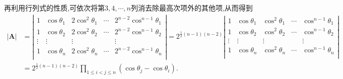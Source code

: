 \documentclass[../../main.tex]{subfiles}
\begin{document}
\begin{solution}
再利用行列式的性质,可依次将第\(3,4,\cdots,n\)列消去除最高次项外的其他项,从而得到
\begin{align*}
|\boldsymbol{A}|&=\left| \begin{matrix}
1&		\cos \theta _1&		2\cos ^2\theta _1&		\cdots&		2^{n-2}\cos ^{n-1}\theta _1\\
1&		\cos \theta _2&		2\cos ^2\theta _2&		\cdots&		2^{n-2}\cos ^{n-1}\theta _2\\
\vdots&		\vdots&		\vdots&		&		\vdots\\
1&		\cos \theta _n&		2\cos ^2\theta _n&		\cdots&		2^{n-2}\cos ^{n-1}\theta _n\\
\end{matrix} \right|=2^{\frac{1}{2}(n-1)(n-2)}\left| \begin{matrix}
1&		\cos \theta _1&		\cos ^2\theta _1&		\cdots&		\cos ^{n-1}\theta _1\\
1&		\cos \theta _2&		\cos ^2\theta _2&		\cdots&		\cos ^{n-1}\theta _2\\
\vdots&		\vdots&		\vdots&		&		\vdots\\
1&		\cos \theta _n&		\cos ^2\theta _n&		\cdots&		\cos ^{n-1}\theta _n\\
\end{matrix} \right|
\\
&=2^{\frac{1}{2}(n-1)(n-2)}\prod_{1\le i<j\le n}{\left( \cos \theta _j-\cos \theta _i \right)}.
\end{align*}
\end{solution}
\end{document}
